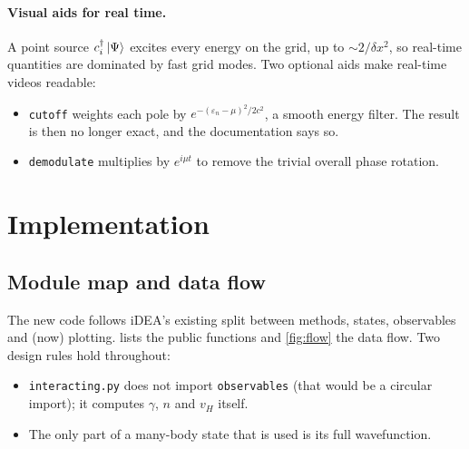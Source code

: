 \documentclass[11pt,a4paper]{article}
\newcommand{\iDEA}{iDEA}
\newcommand{\code}[1]{\texttt{#1}}
\newcommand{\dx}{\delta x}
\begin{document}
\paragraph{Visual aids for real time.} A point source $c_i^\dagger\ket{\Psi}$ excites every energy on the grid, up to $\sim 2/\dx^2$, so real-time quantities are dominated by fast grid modes. Two optional aids make real-time videos readable:
\begin{itemize}
\item \code{cutoff} weights each pole by $e^{-(\varepsilon_n-\mu)^2/2c^2}$, a smooth energy filter. The result is then no longer exact, and the documentation says so.
\item \code{demodulate} multiplies by $e^{i\mu t}$ to remove the trivial overall phase rotation.
\end{itemize}

\section{Implementation}
\label{sec:implementation}

\subsection{Module map and data flow}

The new code follows \iDEA{}'s existing split between methods, states, observables and (now) plotting.  lists the public functions and \cref{fig:flow} the data flow. Two design rules hold throughout:
\begin{itemize}
\item \code{interacting.py} does not import \code{observables} (that would be a circular import); it computes $\gamma$, $n$ and $v_H$ itself.
\item The only part of a many-body state that is used is its full wavefunction.
\end{itemize}
\end{document}
